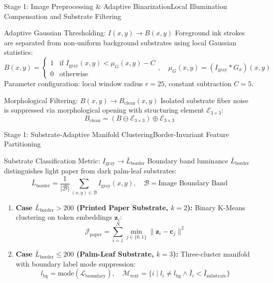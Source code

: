 \documentclass[
  aspectratio=169,
]{beamer}
\begin{document}
\begin{frame}{Stage 1: Image Preprocessing \& Adaptive Binarization}{Local Illumination Compensation and Substrate Filtering}
\begin{block}{Adaptive Gaussian Thresholding: $I(x,y) \rightarrow B(x,y)$}
Foreground ink strokes are separated from non-uniform background substrates using local Gaussian statistics:
\[
  B(x,y) = \begin{cases} 
    1 & \text{if } I_{\text{gray}}(x,y) < \mu_G(x,y) - C \\
    0 & \text{otherwise}
  \end{cases}, \quad \mu_G(x,y) = (I_{\text{gray}} * G_\sigma)(x,y)
\]
Parameter configuration: local window radius $r=25$, constant subtraction $C=5$.
\end{block}
\begin{block}{Morphological Filtering: $B(x,y) \rightarrow B_{\text{clean}}(x,y)$}
Isolated substrate fiber noise is suppressed via morphological opening with structuring element $\mathcal{E}_{3\times 3}$:
\[
  B_{\text{clean}} = (B \ominus \mathcal{E}_{3\times 3}) \oplus \mathcal{E}_{3\times 3}
\]
\end{block}
\end{frame}

\begin{frame}{Stage 1: Substrate-Adaptive Manifold Clustering}{Border-Invariant Feature Partitioning}
\begin{block}{Substrate Classification Metric: $I_{\text{gray}} \rightarrow \bar{L}_{\text{border}}$}
Boundary band luminance $\bar{L}_{\text{border}}$ distinguishes light paper from dark palm-leaf substrates:
\[
  \bar{L}_{\text{border}} = \frac{1}{|\mathcal{B}|} \sum_{(x,y) \in \mathcal{B}} I_{\text{gray}}(x,y), \quad \mathcal{B} = \text{Image Boundary Band}
\]
\end{block}
\begin{enumerate}
  \item \textbf{Case $\bar{L}_{\text{border}} > 200$ (Printed Paper Substrate, $k=2$):}
  Binary K-Means clustering on token embeddings $\mathbf{z}_i$:
  \[
    \mathcal{J}_{\text{paper}} = \sum_{i=1}^N \min_{j \in \{0,1\}} \|\mathbf{z}_i - \mathbf{c}_j\|^2
  \]
  \item \textbf{Case $\bar{L}_{\text{border}} \le 200$ (Palm-Leaf Substrate, $k=3$):}
  Three-cluster manifold with boundary label mode suppression:
  \[
    l_{\text{bg}} = \text{mode}\left(\mathcal{L}_{\text{boundary}}\right), \quad \mathcal{M}_{\text{text}} = \{i \mid l_i \neq l_{\text{bg}} \land \bar{I}_i < \bar{I}_{\text{substrate}}\}
  \]
\end{enumerate}
\end{frame}
\end{document}

